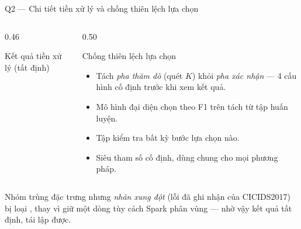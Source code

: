 \documentclass[aspectratio=169, 11pt]{beamer}
\begin{document}
\begin{frame}[label=bk-prep]{Q2 --- Chi tiết tiền xử lý và chống thiên lệch lựa chọn}
  \begin{columns}[T]
    \begin{column}{0.46\textwidth}
      \begin{block}{Kết quả tiền xử lý (tất định)}
        \footnotesize
      \end{block}
    \end{column}
    \begin{column}{0.50\textwidth}
      \begin{exampleblock}{Chống thiên lệch lựa chọn}
        \footnotesize
        \begin{itemize}
          \item Tách \emph{pha thăm dò} (quét $K$) khỏi \emph{pha xác nhận} ---
                4 cấu hình cố định trước khi xem kết quả.
          \item Mô hình đại diện chọn theo F1 trên  tách từ tập
                huấn luyện.
          \item Tập kiểm tra  bất kỳ bước lựa chọn nào.
          \item Siêu tham số cố định, dùng chung cho mọi phương pháp.
        \end{itemize}
      \end{exampleblock}
    \end{column}
  \end{columns}
  \footnotesize
  Nhóm trùng đặc trưng nhưng \emph{nhãn xung đột} (lỗi đã ghi nhận của
  CICIDS2017) bị loại , thay vì giữ một dòng tùy cách Spark phân
  vùng --- nhờ vậy kết quả tất định, tái lập được.
\end{frame}
\end{document}
